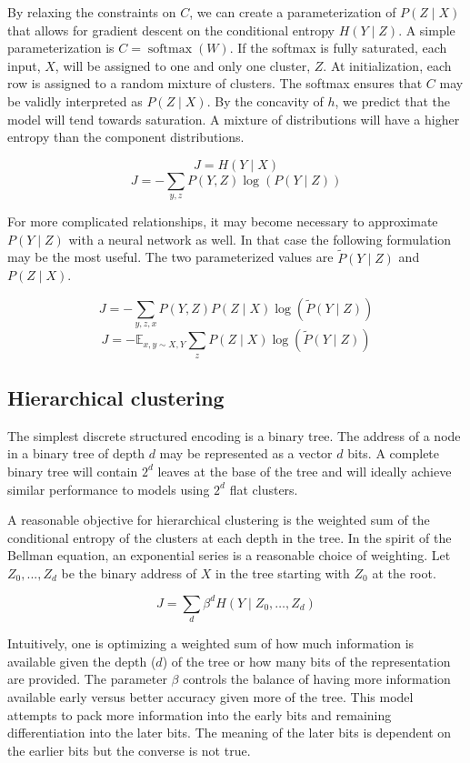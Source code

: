 \documentclass[11pt,letterpaper]{article}
\begin{document}
By relaxing the constraints on $C$, we can create a parameterization of $P(Z \mid X)$ that allows for gradient descent on the conditional entropy $H(Y\mid Z)$. A simple parameterization
is $C=\operatorname{softmax}(W)$. If the softmax is fully saturated, each input, $X$, will be assigned to one and only one cluster, $Z$. At initialization, each row is assigned to a random mixture of clusters. The softmax ensures that $C$ may be validly interpreted as $P(Z \mid X)$. By the concavity of $h$, we predict that the model will tend towards saturation. A mixture of distributions will have a higher entropy than the component distributions.

$$ J = H(Y \mid X) $$
$$ J = - \sum_{y,z} P(Y, Z) \log( P(Y \mid Z)) $$

For more complicated relationships, it may become necessary to approximate $P(Y \mid Z)$ with a neural network as well. In that case the following formulation may be the most useful. The two parameterized values are $\tilde{P}(Y \mid Z)$ and $P(Z \mid X)$.

$$ J = - \sum_{y,z,x} P(Y, Z) P(Z \mid X) \log( \tilde{P}(Y \mid Z)) $$
$$ J = - \mathbb{E}_{x,y \sim X, Y} \sum_{z} P(Z \mid X) \log( \tilde{P}(Y \mid Z)) $$

\subsection{Hierarchical clustering}

The simplest discrete structured encoding is a binary tree. The address of a node in a binary tree of depth $d$ may be represented as a vector $d$ bits. A complete binary tree will contain $2^d$ leaves at the base of the tree and will ideally achieve similar performance to models using $2^d$ flat clusters.

A reasonable objective for hierarchical clustering is the weighted sum of the conditional entropy of the clusters at each depth in the tree. In the spirit of the Bellman equation, an exponential series is a reasonable choice of weighting. Let $Z_0,...,Z_d$ be the binary address of $X$ in the tree starting with $Z_0$ at the root.

$$ J = \sum_d \beta ^ d  H(Y \mid Z_0,\ldots, Z_d) $$

Intuitively, one is optimizing a weighted sum of how much information is available given the depth ($d$) of the tree or how many bits of the representation are provided. The parameter $\beta$ controls the balance of having more information available early versus better accuracy given more of the tree. This model attempts to pack more information into the early bits and remaining differentiation into the later bits. The meaning of the later bits is dependent on the earlier bits but the converse is not true.
\end{document}
